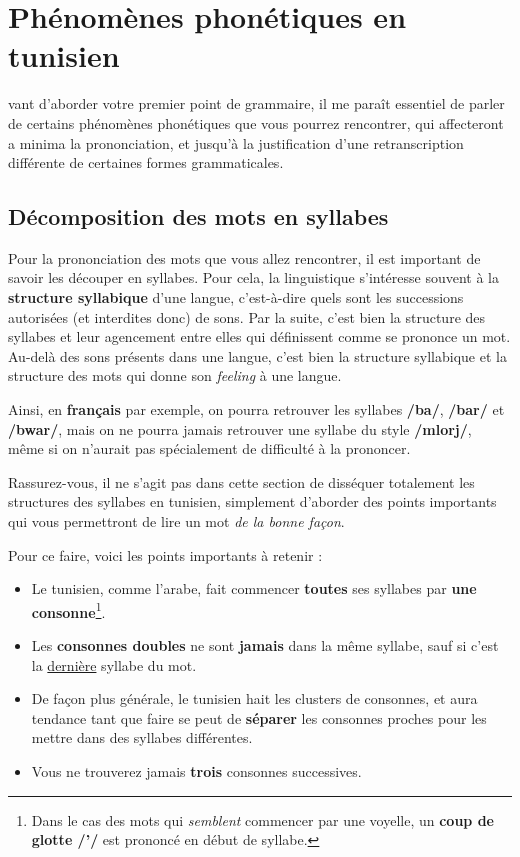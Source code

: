 \chapter{Phénomènes phonétiques en tunisien}
vant d'aborder votre premier point de grammaire, il me paraît essentiel de parler de certains phénomènes phonétiques que vous pourrez rencontrer, qui affecteront a minima la prononciation, et jusqu'à la justification d'une retranscription différente de certaines formes grammaticales.

\section{Décomposition des mots en syllabes}
Pour la prononciation des mots que vous allez rencontrer, il est important de savoir les découper en syllabes. Pour cela, la linguistique s'intéresse souvent à la \textbf{structure syllabique} d'une langue, c'est-à-dire quels sont les successions autorisées (et interdites donc) de sons. Par la suite, c'est bien la structure des syllabes et leur agencement entre elles qui définissent comme se prononce un mot. Au-delà des sons présents dans une langue, c'est bien la structure syllabique et la structure des mots qui donne son \textit{feeling} à une langue.

Ainsi, en \textbf{français} par exemple, on pourra retrouver les syllabes \textbf{/ba/}, \textbf{/bar/} et \textbf{/bwar/}, mais on ne pourra jamais retrouver une syllabe du style \textbf{/mlorj/}, même si on n'aurait pas spécialement de difficulté à la prononcer.

Rassurez-vous, il ne s'agit pas dans cette section de disséquer totalement les structures des syllabes en tunisien, simplement d'aborder des points importants qui vous permettront de lire un mot \textit{de la bonne façon}. 

Pour ce faire, voici les points importants à retenir : 
\begin{itemize}
    \item Le tunisien, comme l'arabe, fait commencer \textbf{toutes} ses syllabes par \textbf{une consonne}\footnote{Dans le cas des mots qui \textit{semblent} commencer par une voyelle, un \textbf{coup de glotte /'/} est prononcé en début de syllabe.}.
    \item Les \textbf{consonnes doubles} ne sont \textbf{jamais} dans la même syllabe, sauf si c'est la \underline{dernière} syllabe du mot.
    \item De façon plus générale, le tunisien hait les clusters de consonnes, et aura tendance tant que faire se peut de \textbf{séparer} les consonnes proches pour les mettre dans des syllabes différentes.
    \item Vous ne trouverez jamais \textbf{trois} consonnes successives.
\end{itemize}

